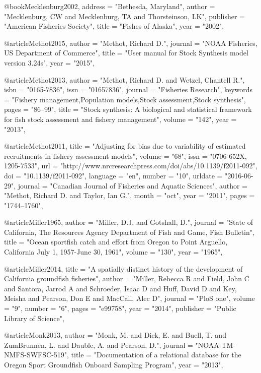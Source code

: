 @book{Mecklenburg2002,
    address = "{Bethesda, Maryland}",
    author = "{Mecklenburg, CW and Mecklenburg, TA and Thorsteinson, LK}",
    publisher = "{American Fisheries Society}",
    title = "{{Fishes of Alaska}}",
    year = "{2002}",
}

@article{Methot2015,
    author = "{Methot, Richard D.}",
    journal = "{NOAA Fisheries, US Department of Commerce}",
    title = "{{User manual for Stock Synthesis model version 3.24s}}",
    year = "{2015}",
}

@article{Methot2013,
    author = "{Methot, Richard D. and Wetzel, Chantell R.}",
    isbn = "{0165-7836}",
    issn = "{01657836}",
    journal = "{Fisheries Research}",
    keywords = "{Fishery management,Population models,Stock assessment,Stock synthesis}",
    pages = "{86--99}",
    title = "{{Stock synthesis: A biological and statistical framework for fish stock assessment and fishery management}}",
    volume = "{142}",
    year = "{2013}",
}

@article{Methot2011,
    title = "{Adjusting for bias due to variability of estimated recruitments in fishery assessment models}",
    volume = "{68}",
    issn = "{0706-652X, 1205-7533}",
    url = "{http://www.nrcresearchpress.com/doi/abs/10.1139/f2011-092}",
    doi = "{10.1139/f2011-092}",
    language = "{en}",
    number = "{10}",
    urldate = "{2016-06-29}",
    journal = "{Canadian Journal of Fisheries and Aquatic Sciences}",
    author = "{Methot, Richard D. and Taylor, Ian G.}",
    month = "oct",
    year = "{2011}",
    pages = "{1744--1760}",
}

@article{Miller1965,
    author = "{Miller, D.J. and Gotshall, D.}",
    journal = "{State of California, The Resources Agency Department of Fish and Game, Fish Bulletin}",
    title = "{{Ocean sportfish catch and effort from Oregon to Point Arguello, California July 1, 1957-June 30, 1961}}",
    volume = "{130}",
    year = "{1965}",
}

@article{Miller2014,
    title = "{A spatially distinct history of the development of California groundfish fisheries}",
    author = "{Miller, Rebecca R and Field, John C and Santora, Jarrod A and Schroeder, Isaac D and Huff, David D and Key, Meisha and Pearson, Don E and MacCall, Alec D}",
    journal = "{PloS one}",
    volume = "{9}",
    number = "{6}",
    pages = "{e99758}",
    year = "{2014}",
    publisher = "{Public Library of Science}",
}

@article{Monk2013,
    author = "{Monk, M. and Dick, E. and Buell, T. and ZumBrunnen, L. and Dauble, A. and Pearson, D.}",
    journal = "{NOAA-TM-NMFS-SWFSC-519}",
    title = "{{Documentation of a relational database for the Oregon Sport Groundfish Onboard Sampling Program}}",
    year = "{2013}",
}

